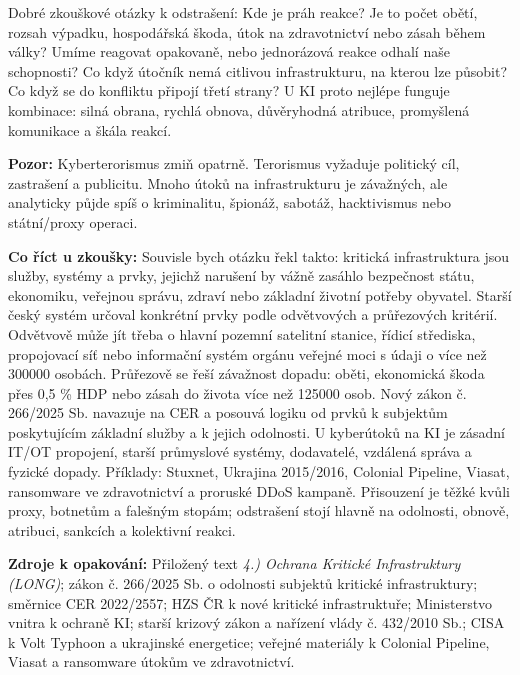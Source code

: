 \documentclass[11pt,a4paper]{article}
\newcommand{\zkouska}[1]{\begin{tcolorbox}[breakable,enhanced,colback=blue!7,colframe=blue!30!black,boxrule=0pt,arc=1mm,left=5pt,right=5pt,top=5pt,bottom=5pt,before skip=6pt,after skip=6pt]\textbf{Co říct u zkoušky:} #1\end{tcolorbox}}
\newcommand{\pozor}[1]{\begin{tcolorbox}[breakable,enhanced,colback=red!7,colframe=red!30!black,boxrule=0pt,arc=1mm,left=5pt,right=5pt,top=5pt,bottom=5pt,before skip=6pt,after skip=6pt]\textbf{Pozor:} #1\end{tcolorbox}}
\newcommand{\zdroje}[1]{\medskip\noindent\textbf{Zdroje k opakování:} #1\medskip}
\begin{document}
Dobré zkouškové otázky k odstrašení: Kde je práh reakce? Je to počet obětí, rozsah výpadku, hospodářská škoda, útok na zdravotnictví nebo zásah během války? Umíme reagovat opakovaně, nebo jednorázová reakce odhalí naše schopnosti? Co když útočník nemá citlivou infrastrukturu, na kterou lze působit? Co když se do konfliktu připojí třetí strany? U KI proto nejlépe funguje kombinace: silná obrana, rychlá obnova, důvěryhodná atribuce, promyšlená komunikace a škála reakcí.

\pozor{Kyberterorismus zmiň opatrně. Terorismus vyžaduje politický cíl, zastrašení a publicitu. Mnoho útoků na infrastrukturu je závažných, ale analyticky půjde spíš o kriminalitu, špionáž, sabotáž, hacktivismus nebo státní/proxy operaci.}

\zkouska{Souvisle bych otázku řekl takto: kritická infrastruktura jsou služby, systémy a prvky, jejichž narušení by vážně zasáhlo bezpečnost státu, ekonomiku, veřejnou správu, zdraví nebo základní životní potřeby obyvatel. Starší český systém určoval konkrétní prvky podle odvětvových a průřezových kritérií. Odvětvově může jít třeba o hlavní pozemní satelitní stanice, řídicí střediska, propojovací síť nebo informační systém orgánu veřejné moci s údaji o více než 300000 osobách. Průřezově se řeší závažnost dopadu: oběti, ekonomická škoda přes 0,5 \% HDP nebo zásah do života více než 125000 osob. Nový zákon č. 266/2025 Sb. navazuje na CER a posouvá logiku od prvků k subjektům poskytujícím základní služby a k jejich odolnosti. U kyberútoků na KI je zásadní IT/OT propojení, starší průmyslové systémy, dodavatelé, vzdálená správa a fyzické dopady. Příklady: Stuxnet, Ukrajina 2015/2016, Colonial Pipeline, Viasat, ransomware ve zdravotnictví a proruské DDoS kampaně. Přisouzení je těžké kvůli proxy, botnetům a falešným stopám; odstrašení stojí hlavně na odolnosti, obnově, atribuci, sankcích a kolektivní reakci.}

\zdroje{Přiložený text \emph{4.) Ochrana Kritické Infrastruktury (LONG)}; zákon č. 266/2025 Sb. o odolnosti subjektů kritické infrastruktury; směrnice CER 2022/2557; HZS ČR k nové kritické infrastruktuře; Ministerstvo vnitra k ochraně KI; starší krizový zákon a nařízení vlády č. 432/2010 Sb.; CISA k Volt Typhoon a ukrajinské energetice; veřejné materiály k Colonial Pipeline, Viasat a ransomware útokům ve zdravotnictví.}

\iffalse
\end{document}
